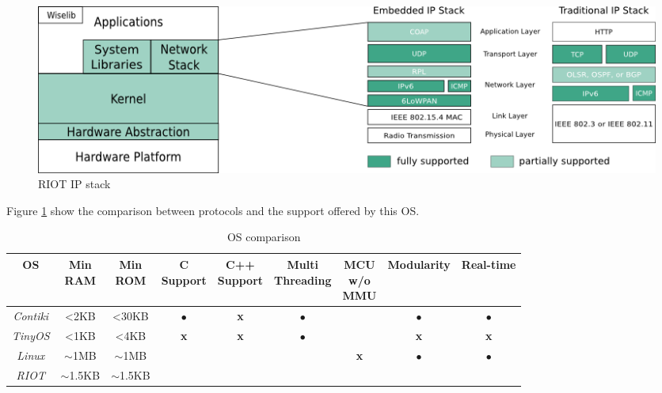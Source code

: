 \begin{figure}[htb]
	\centering
	\includegraphics[width=1\columnwidth]{chapters/background.images/RIOTIPStack.png}
	\caption{RIOT IP stack}
	\label{fig:RIOTIPStack}
\end{figure}

Figure \ref{fig:RIOTIPStack} show the comparison between protocols and the support offered by this OS. 

\begin{table}[htb]
	\scriptsize
	\centering
	\caption{OS comparison}
	\label{tab:OSComparison}
	\begin{tabular}{|c|cccccccc}
		\hline
		\textbf{OS} & 
		\multicolumn{1}{p{0.8cm}|}{\textbf{Min} \newline \textbf{RAM}} &
		\multicolumn{1}{p{0.8cm}|}{\textbf{Min} \newline \textbf{ROM}} &
		\multicolumn{1}{p{1.3cm}|}{\textbf{C} \newline \textbf{Support}} &
		\multicolumn{1}{p{1.3cm}|}{\textbf{C++} \newline \textbf{Support}} &
		\multicolumn{1}{p{1.6cm}|}{\textbf{Multi} \newline \textbf{Threading}} &
		\multicolumn{1}{p{1cm}|}{\textbf{MCU} \newline \textbf{w/o} \newline \textbf{MMU}} &
		\multicolumn{1}{c|}{\textbf{Modularity}} &
		\multicolumn{1}{c|}{\textbf{Real-time}} \\ \hline
		\textit{Contiki} & \textless 2KB & \textless 30KB &$\bullet$ & \textbf{x}       & $\bullet$     & \checkmark     &$\bullet$ &    $\bullet$ \\ \cline{1-1}
		\textit{TinyOS}  & \textless 1KB & \textless 4KB  &\textbf{x}& \textbf{x}       & $\bullet$     & \checkmark     &\textbf{x}&   \textbf{x}\\ \cline{1-1}
		\textit{Linux}   & $\mathtt{\sim}$1MB &$\mathtt{\sim}$1MB&\checkmark & \checkmark       &  \checkmark   & \textbf{x} &$\bullet$   &$\bullet$    \\ \cline{1-1}
		\textit{RIOT} & $\mathtt{\sim}$1.5KB & $\mathtt{\sim}$1.5KB & \checkmark    & \checkmark       & \checkmark & \checkmark & \checkmark & \checkmark  \\ \cline{1-1}
	\end{tabular}
\end{table}

